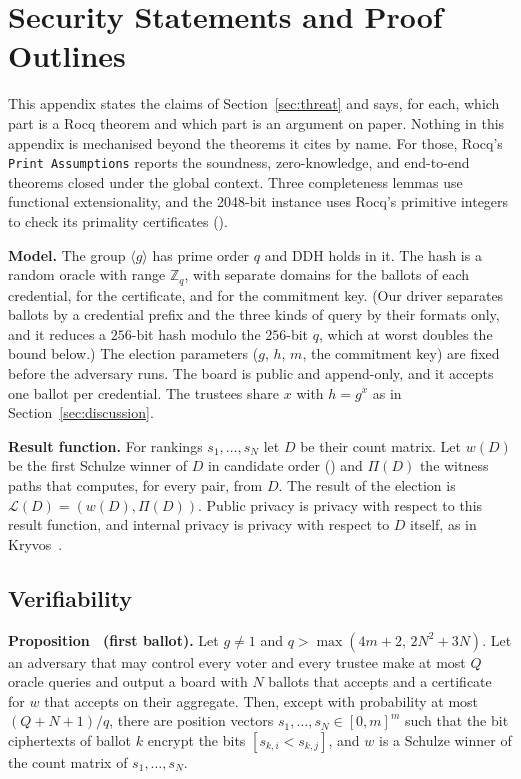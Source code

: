 \section{Security Statements and Proof Outlines}\label{app:security}
This appendix states the claims of Section~\ref{sec:threat} and says, for
each, which part is a Rocq theorem and which part is an argument on
paper. Nothing in this appendix is mechanised beyond the theorems it
cites by name. For those, Rocq's \texttt{Print Assumptions} reports the
soundness, zero-knowledge, and end-to-end theorems closed under the
global context. Three completeness lemmas use functional extensionality,
and the 2048-bit instance uses Rocq's primitive integers to check its
primality certificates ().

\textbf{Model.} The group $\langle g \rangle$ has prime order $q$ and
DDH holds in it. The hash is a random oracle with range $\mathbb{Z}_q$,
with separate domains for the ballots of each credential, for the
certificate, and for the commitment key. (Our driver separates ballots
by a credential prefix and the three kinds of query by their formats
only, and it reduces a $256$-bit hash modulo the $256$-bit $q$, which at
worst doubles the bound below.) The election parameters ($g$,
$h$, $m$, the commitment key) are fixed before the adversary runs. The
board is public and append-only, and it accepts one ballot per
credential. The trustees share $x$ with $h = g^x$ as in
Section~\ref{sec:discussion}.

\textbf{Result function.} For rankings $s_1, \ldots, s_N$ let $D$ be
their count matrix. Let $w(D)$ be the first Schulze winner of $D$ in
candidate order () and $\Pi(D)$ the witness paths that
 computes, for every pair, from $D$. The result of
the election is $\mathcal{L}(D) = (w(D), \Pi(D))$. Public privacy is
privacy with respect to this result function, and internal privacy is
privacy with respect to $D$ itself, as in Kryvos~\cite{kryvos2022}.

\subsection{Verifiability}
\label{prop:verif}
\textbf{Proposition~\thesecclaim{} (first ballot).} Let $g \ne 1$ and
$q > \max(4m + 2,\, 2N^2 + 3N)$. Let an adversary that may control every
voter and every trustee make at most $Q$ oracle queries and output a
board with $N$ ballots that  accepts and a
certificate for $w$ that  accepts on their
aggregate. Then, except with probability at most $(Q + N + 1)/q$, there
are position vectors $s_1, \ldots, s_N \in [0, m]^m$ such that the bit
ciphertexts of ballot $k$ encrypt the bits $[s_{k,i} < s_{k,j}]$, and
$w$ is a Schulze winner of the count matrix of $s_1, \ldots, s_N$.

